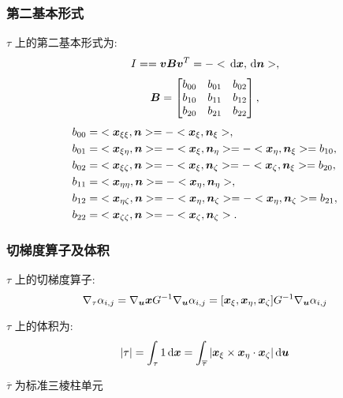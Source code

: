 \documentclass{beamer}
\numberwithin{subsection}{section}
\begin{document}
\begin{frame}
    \frametitle{第二基本形式}
    $\tau$ 上的第二基本形式为:
    \begin{align*}
        I =={\boldsymbol v}{\boldsymbol B}{\boldsymbol v}^T = -<\,\mathrm d {\boldsymbol x}, \,\mathrm d {\boldsymbol n}> ,
    \end{align*}
    \begin{align*}
        {\boldsymbol B} = 
        \begin{bmatrix}
            b_{00} & b_{01} & b_{02} \\
            b_{10} & b_{11} & b_{12} \\
            b_{20} & b_{21} & b_{22}
        \end{bmatrix},
    \end{align*}
    \begin{align*}
        b_{00} = & <{\boldsymbol x}_{\xi\xi}, {\boldsymbol n}> = -<{\boldsymbol x}_\xi, {\boldsymbol n}_\xi>,\\
        b_{01} = & <{\boldsymbol x}_{\xi\eta}, {\boldsymbol n}> = -<{\boldsymbol x}_\xi, {\boldsymbol n}_\eta> 
        = -<{\boldsymbol x}_\eta, {\boldsymbol n}_\xi> = b_{10},\\
        b_{02} = & <{\boldsymbol x}_{\xi\zeta}, {\boldsymbol n}> = -<{\boldsymbol x}_\xi, {\boldsymbol n}_\zeta>
        = -<{\boldsymbol x}_\zeta, {\boldsymbol n}_\xi> = b_{20},\\
        b_{11} = & <{\boldsymbol x}_{\eta\eta},{\boldsymbol n}> = -<{\boldsymbol x}_\eta, {\boldsymbol n}_\eta>,\\
        b_{12} = & <{\boldsymbol x}_{\eta\zeta},{\boldsymbol n}> = -<{\boldsymbol x}_\eta, {\boldsymbol n}_\zeta>
        = -<{\boldsymbol x}_\eta, {\boldsymbol n}_\zeta> = b_{21},\\
        b_{22} = & <{\boldsymbol x}_{\zeta\zeta},{\boldsymbol n}> = -<{\boldsymbol x}_\zeta, {\boldsymbol n}_\zeta>.
    \end{align*}
\end{frame}

\begin{frame}
    \frametitle{切梯度算子及体积}
    $\tau$ 上的切梯度算子:
    \begin{equation*}
        \nabla_\tau \alpha_{i,j} = 
        \nabla_{\boldsymbol u}{\boldsymbol x} G^{-1}\nabla_{\boldsymbol u} \alpha_{i,j} = 
        [{\boldsymbol x}_\xi, {\boldsymbol x}_\eta, {\boldsymbol x}_\zeta]G^{-1}\nabla_{\boldsymbol u} \alpha_{i,j}
    \end{equation*}

    $\tau$ 上的体积为:
    \begin{align*}
        |\tau| = \int_{\tau}1\,\mathrm d{\boldsymbol x} =
        \int_{\overline{\tau}}|{\boldsymbol x}_{\xi}\times{\boldsymbol x}_{\eta}\cdot{\boldsymbol x}_{\zeta}|
        \,\mathrm d {\boldsymbol u}
    \end{align*}
    \begin{remark}
        $\overline{\tau}$ 为标准三棱柱单元
    \end{remark}
\end{frame}
\end{document}
